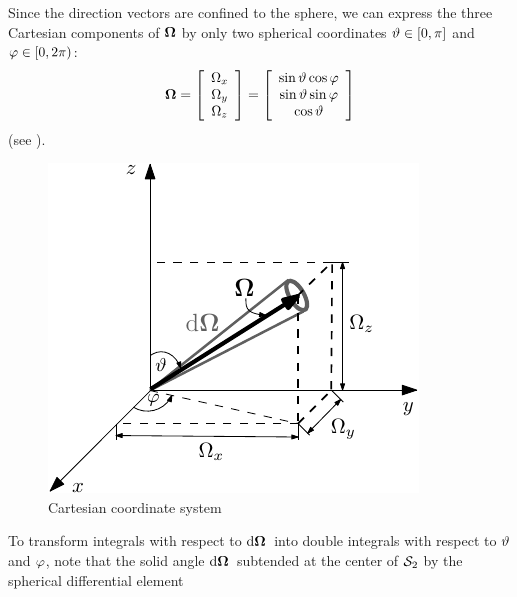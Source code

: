 
Since the direction vectors are confined to the sphere, we can express the three
Cartesian components of $\mathbf{\Omega}$ by only two spherical coordinates $\vartheta\in[0,\pi]$ and
$\varphi\in[0,2\pi)$:
\begin{equation*}
	\mathbf{\Omega} = \left[\begin{array}{c}
		\Omega_x \\
		\Omega_y \\
		\Omega_z
	\end{array}\right] = \left[\begin{array}{c}
		\sin \vartheta\cos \varphi \\
		\sin \vartheta\sin \varphi \\
		\cos \vartheta
	\end{array}\right]
\end{equation*}
(see ).
\begin{figure}[!hbt]
    \centering
    \includegraphics[scale=1.275]{cartesian_streaming}
    \caption[Cartesian coordinate system]{Cartesian coordinate system}
    \label{fig:streaming}
\end{figure}
To transform integrals with respect to $\text{d}\mathbf{\Omega}\,$ into double integrals with respect to $\vartheta$ and $\varphi$,
note that the solid angle $\text{d}\mathbf{\Omega}\,$ subtended at the center of $\mathcal{S}_2$ by the spherical differential element
